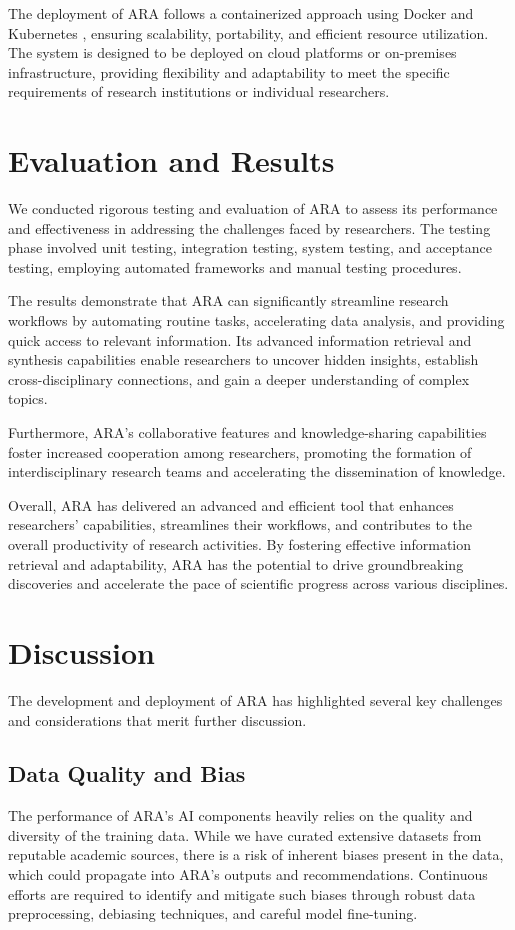 \documentclass[a4paper,conference]{IEEEtran}
\begin{document}
The deployment of ARA follows a containerized approach using Docker \cite{docker} and Kubernetes \cite{kubernetes}, ensuring scalability, portability, and efficient resource utilization. The system is designed to be deployed on cloud platforms or on-premises infrastructure, providing flexibility and adaptability to meet the specific requirements of research institutions or individual researchers.

\section{Evaluation and Results}
We conducted rigorous testing and evaluation of ARA to assess its performance and effectiveness in addressing the challenges faced by researchers. The testing phase involved unit testing, integration testing, system testing, and acceptance testing, employing automated frameworks and manual testing procedures.

The results demonstrate that ARA can significantly streamline research workflows by automating routine tasks, accelerating data analysis, and providing quick access to relevant information. Its advanced information retrieval and synthesis capabilities enable researchers to uncover hidden insights, establish cross-disciplinary connections, and gain a deeper understanding of complex topics.

Furthermore, ARA's collaborative features and knowledge-sharing capabilities foster increased cooperation among researchers, promoting the formation of interdisciplinary research teams and accelerating the dissemination of knowledge.

Overall, ARA has delivered an advanced and efficient tool that enhances researchers' capabilities, streamlines their workflows, and contributes to the overall productivity of research activities. By fostering effective information retrieval and adaptability, ARA has the potential to drive groundbreaking discoveries and accelerate the pace of scientific progress across various disciplines.

\section{Discussion}
The development and deployment of ARA has highlighted several key challenges and considerations that merit further discussion.

\subsection{Data Quality and Bias}
The performance of ARA's AI components heavily relies on the quality and diversity of the training data. While we have curated extensive datasets from reputable academic sources, there is a risk of inherent biases present in the data, which could propagate into ARA's outputs and recommendations. Continuous efforts are required to identify and mitigate such biases through robust data preprocessing, debiasing techniques, and careful model fine-tuning.
\end{document}
